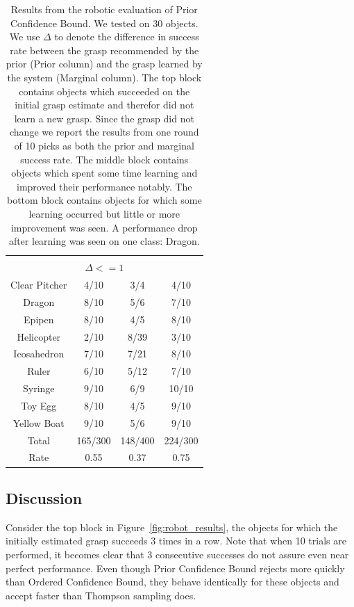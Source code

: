 \documentclass{article}
\newcommand{\algorithmCTxt}{Ordered Confidence Bound\xspace}
\newcommand{\algorithmDTxt}{Prior Confidence Bound\xspace}
\begin{document}
\begin{table}
\begin{tabular}{cccc}
\midrule
\\
\multicolumn{4}{c}{$\Delta <= 1$} \\
\midrule
Clear Pitcher       & 4/10          &  3/4         &  4/10 \\
Dragon    	    & 8/10          &  5/6         &  7/10 \\
Epipen    	    & 8/10          &  4/5         &  8/10 \\
Helicopter    	    & 2/10          &  8/39        &  3/10 \\
Icosahedron    	    & 7/10          &  7/21        &  8/10 \\
Ruler    	    & 6/10          &  5/12        &  7/10 \\
Syringe    	    & 9/10          &  6/9         &  10/10\\
Toy Egg    	    & 8/10          &  4/5         &  9/10 \\
Yellow Boat    	    & 9/10          &  5/6         &  9/10 \\
\midrule
Total		    & 165/300       &  148/400     & 224/300\\
Rate		    & 0.55          &  0.37        & 0.75\\
\bottomrule
\end{tabular}
\caption{Results from the robotic evaluation of \algorithmDTxt. We tested on 30 objects. We use
$\Delta$ to denote the difference in success rate between the grasp recommended
by the prior (Prior column) and the grasp learned by the system (Marginal
column). The top block contains objects which succeeded on the initial grasp
estimate and therefor did not learn a new grasp. Since the grasp did not change
we report the results from one round of 10 picks as both the prior and marginal
success rate.  The middle block contains objects which spent some time learning
and improved their performance notably. The bottom block contains objects for
which some learning occurred but little or more improvement was seen. A
performance drop after learning was seen on one class:
Dragon.\label{table:robot_results}}
\end{table}

\subsection{Discussion}
Consider the top block in Figure~\ref{fig:robot_results}, the objects for which the
initially estimated grasp succeeds 3 times in a row. Note that when 10 trials are performed,
it becomes clear that 3 consecutive successes do not assure even near perfect performance.
Even though \algorithmDTxt rejects more quickly than \algorithmCTxt, they behave identically
for these objects and accept faster than Thompson sampling does. 
\end{document}
